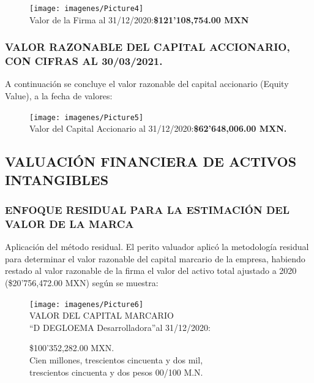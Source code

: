 \begin{figure}[H]
\centering
\texttt{[image: imagenes/Picture4]}\\

\textcolor{principal}{Valor de la Firma al 31/12/2020:}\textbf{\$121'108,754.00 MXN}
\end{figure}

\espacio{1cm}

\subsubsection{VALOR RAZONABLE DEL CAPITAL ACCIONARIO, CON CIFRAS AL 30/03/2021.}
 A continuaci\'on se concluye el valor razonable del capital accionario (Equity Value), a la fecha de valores:

\begin{figure}[H]
\centering
\texttt{[image: imagenes/Picture5]}\\

\textcolor{principal}{Valor del Capital Accionario al 31/12/2020:}\textbf{\$62'648,006.00 MXN.}
\end{figure}

\subsection{VALUACI\'ON FINANCIERA DE ACTIVOS INTANGIBLES}

\subsubsection{ENFOQUE RESIDUAL PARA LA ESTIMACI\'ON DEL VALOR DE LA MARCA}

\textcolor{principal}{Aplicaci\'on del m\'etodo residual.} El perito valuador aplic\'o la metodolog\'ia residual para determinar el valor razonable del capital marcario de la empresa, habiendo restado al valor razonable de la firma el valor del activo total ajustado a 2020 (\$20'756,472.00 MXN) seg\'un se muestra:

\begin{figure}[H]
\centering
\texttt{[image: imagenes/Picture6]}\\[1cm]

\textcolor{principal}{VALOR DEL CAPITAL MARCARIO}\\


\textcolor{principal}{``D DEGLOEMA Desarrolladora''\textregistered al 31/12/2020:}\\[1cm]

\begin{minipage}{8cm}
\begin{center}
\textcolor{principal}{\$100'352,282.00 MXN. }\\

\textcolor{principal}{Cien millones, trescientos cincuenta y dos mil,}\\
\textcolor{principal}{ trescientos cincuenta y dos pesos 00/100 M.N.}
\end{center}
\end{minipage}
\end{figure}
\espacio{1cm}

